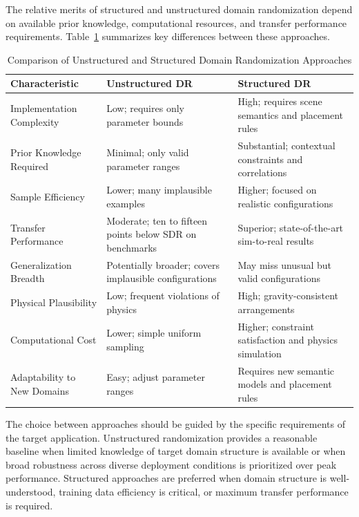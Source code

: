 The relative merits of structured and unstructured domain randomization depend on available prior knowledge, computational resources, and transfer performance requirements. Table~\ref{tab:dr_comparison} summarizes key differences between these approaches.

\begin{table}[htbp]
\centering
\caption{Comparison of Unstructured and Structured Domain Randomization Approaches}
\label{tab:dr_comparison}
\begin{tabular}{p{3.5cm}p{5.5cm}p{5.5cm}}
\toprule
\textbf{Characteristic} & \textbf{Unstructured DR} & \textbf{Structured DR} \\
\midrule
Implementation Complexity & Low; requires only parameter bounds & High; requires scene semantics and placement rules \\
\addlinespace
Prior Knowledge Required & Minimal; only valid parameter ranges & Substantial; contextual constraints and correlations \\
\addlinespace
Sample Efficiency & Lower; many implausible examples & Higher; focused on realistic configurations \\
\addlinespace
Transfer Performance & Moderate; ten to fifteen points below SDR on benchmarks & Superior; state-of-the-art sim-to-real results \\
\addlinespace
Generalization Breadth & Potentially broader; covers implausible configurations & May miss unusual but valid configurations \\
\addlinespace
Physical Plausibility & Low; frequent violations of physics & High; gravity-consistent arrangements \\
\addlinespace
Computational Cost & Lower; simple uniform sampling & Higher; constraint satisfaction and physics simulation \\
\addlinespace
Adaptability to New Domains & Easy; adjust parameter ranges & Requires new semantic models and placement rules \\
\bottomrule
\end{tabular}
\end{table}

The choice between approaches should be guided by the specific requirements of the target application. Unstructured randomization provides a reasonable baseline when limited knowledge of target domain structure is available or when broad robustness across diverse deployment conditions is prioritized over peak performance. Structured approaches are preferred when domain structure is well-understood, training data efficiency is critical, or maximum transfer performance is required.

